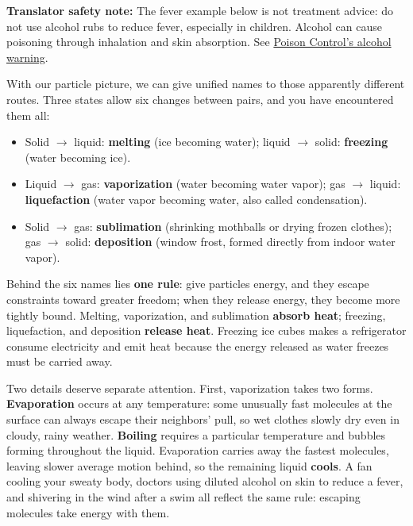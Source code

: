 \textbf{Translator safety note:} The fever example below is not treatment advice: do not use alcohol rubs to reduce fever, especially in children. Alcohol can cause poisoning through inhalation and skin absorption. See \href{https://www.poison.org/articles/rubbing-alcohol-only-looks-like-water}{Poison Control's alcohol warning}.

With our particle picture, we can give unified names to those apparently different routes. Three states allow six changes between pairs, and you have encountered them all:

\begin{itemize}[itemsep=2pt]
\item Solid $\rightarrow$ liquid: \textbf{melting} (ice becoming water); liquid $\rightarrow$ solid: \textbf{freezing} (water becoming ice).
\item Liquid $\rightarrow$ gas: \textbf{vaporization} (water becoming water vapor); gas $\rightarrow$ liquid: \textbf{liquefaction} (water vapor becoming water, also called condensation).
\item Solid $\rightarrow$ gas: \textbf{sublimation} (shrinking mothballs or drying frozen clothes); gas $\rightarrow$ solid: \textbf{deposition} (window frost, formed directly from indoor water vapor).
\end{itemize}

Behind the six names lies \textbf{one rule}: give particles energy, and they escape constraints toward greater freedom; when they release energy, they become more tightly bound. Melting, vaporization, and sublimation \textbf{absorb heat}; freezing, liquefaction, and deposition \textbf{release heat}. Freezing ice cubes makes a refrigerator consume electricity and emit heat because the energy released as water freezes must be carried away.

Two details deserve separate attention. First, vaporization takes two forms. \textbf{Evaporation} occurs at any temperature: some unusually fast molecules at the surface can always escape their neighbors' pull, so wet clothes slowly dry even in cloudy, rainy weather. \textbf{Boiling} requires a particular temperature and bubbles forming throughout the liquid. Evaporation carries away the fastest molecules, leaving slower average motion behind, so the remaining liquid \textbf{cools}. A fan cooling your sweaty body, doctors using diluted alcohol on skin to reduce a fever, and shivering in the wind after a swim all reflect the same rule: escaping molecules take energy with them.

